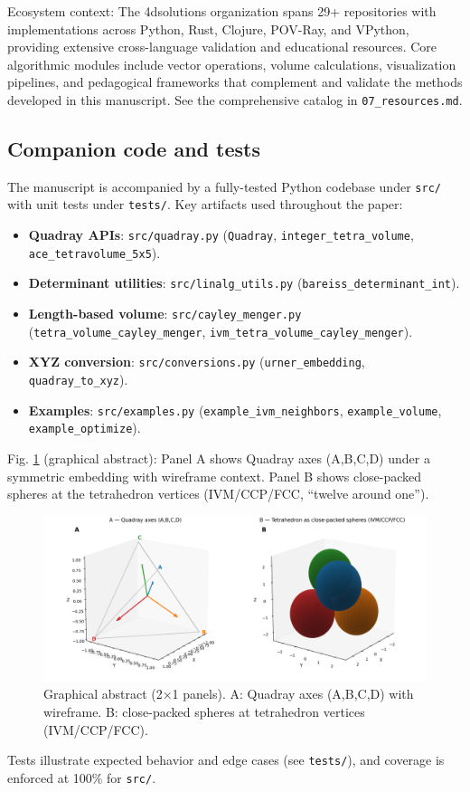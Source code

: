 \documentclass[
]{article}
\providecommand{\tightlist}{%
  \setlength{\itemsep}{0pt}\setlength{\parskip}{0pt}}
\begin{document}
Ecosystem context: The 4dsolutions organization spans 29+ repositories
with implementations across Python, Rust, Clojure, POV-Ray, and VPython,
providing extensive cross-language validation and educational resources.
Core algorithmic modules include vector operations, volume calculations,
visualization pipelines, and pedagogical frameworks that complement and
validate the methods developed in this manuscript. See the comprehensive
catalog in \texttt{07\_resources.md}.

\hypertarget{companion-code-and-tests}{%
\subsection{Companion code and tests}\label{companion-code-and-tests}}

The manuscript is accompanied by a fully-tested Python codebase under
\texttt{src/} with unit tests under \texttt{tests/}. Key artifacts used
throughout the paper:

\begin{itemize}
\tightlist
\item
  \textbf{Quadray APIs}: \texttt{src/quadray.py} (\texttt{Quadray},
  \texttt{integer\_tetra\_volume}, \texttt{ace\_tetravolume\_5x5}).
\item
  \textbf{Determinant utilities}: \texttt{src/linalg\_utils.py}
  (\texttt{bareiss\_determinant\_int}).
\item
  \textbf{Length-based volume}: \texttt{src/cayley\_menger.py}
  (\texttt{tetra\_volume\_cayley\_menger},
  \texttt{ivm\_tetra\_volume\_cayley\_menger}).
\item
  \textbf{XYZ conversion}: \texttt{src/conversions.py}
  (\texttt{urner\_embedding}, \texttt{quadray\_to\_xyz}).
\item
  \textbf{Examples}: \texttt{src/examples.py}
  (\texttt{example\_ivm\_neighbors}, \texttt{example\_volume},
  \texttt{example\_optimize}).
\end{itemize}

Fig. \ref{fig:graphical_abstract} (graphical abstract): Panel A shows
Quadray axes (A,B,C,D) under a symmetric embedding with wireframe
context. Panel B shows close-packed spheres at the tetrahedron vertices
(IVM/CCP/FCC, ``twelve around one'').

\begin{figure}
\hypertarget{fig:graphical_abstract}{%
\centering
\includegraphics{../output/graphical_abstract_quadray.png}
\caption{Graphical abstract (2×1 panels). A: Quadray axes (A,B,C,D) with
wireframe. B: close-packed spheres at tetrahedron vertices
(IVM/CCP/FCC).}\label{fig:graphical_abstract}
}
\end{figure}

Tests illustrate expected behavior and edge cases (see \texttt{tests/}),
and coverage is enforced at 100\% for \texttt{src/}.
\end{document}
